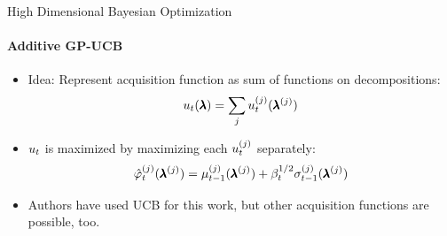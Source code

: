 \begin{frame}[c]{High Dimensional Bayesian Optimization}
\framesubtitle{Additive GP-UCB}
\begin{itemize}

    \item Idea: Represent acquisition function as sum of functions on decompositions:
    \begin{equation*}
        u_{t}(\pmb{\lambda}) = \sum_{j}u_{t}^{(j)}(\pmb{\lambda}^{(j)})
    \end{equation*}
\pause
\medskip    
    \item $u_{t}$ is maximized by maximizing each $u_{t}^{(j)}$ separately:
    \begin{equation*}
        \hat{\varphi}_{t}^{(j)}(\pmb{\lambda}^{(j)}) = \mu_{t-1}^{(j)}(\pmb{\lambda}^{(j)}) + \beta_{t}^{1/2}\sigma_{t-1}^{(j)}(\pmb{\lambda}^{(j)})
    \end{equation*}
    \item Authors have used UCB for this work, but other acquisition functions are possible, too.
\end{itemize}
\end{frame}

\fi
    
            
            
            
            

